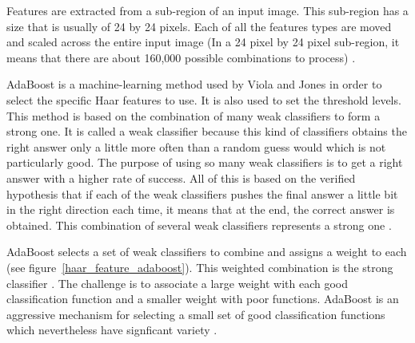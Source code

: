 \vspace{\baselineskip}
\noindent Features are extracted from a sub-region of an input image. This sub-region has a size that is usually of 24 by 24 pixels. Each of all the features types are moved and scaled across the entire input image (In a 24 pixel by 24 pixel sub-region, it means that there are about 160,000 possible combinations to process) \cite{SMY07}.
\newline

\noindent AdaBoost is a machine-learning method used by Viola and Jones in order to select the specific Haar features to use. It is also used to set the threshold levels. This method is based on the combination of many weak classifiers to form a strong one. It is called a weak classifier because this kind of classifiers obtains the right answer only a little more often than a random guess would which is not particularly good. The purpose of using so many weak classifiers is to get a right answer with a higher rate of success. All of this is based on the verified hypothesis that if each of the weak classifiers pushes the final answer a little bit in the right direction each time, it means that at the end, the correct answer is obtained. This combination of several weak classifiers represents a strong one \cite{HEW07}. 
\newline

\noindent AdaBoost selects a set of weak classifiers to combine and assigns a weight to each (see figure~\ref{haar_feature_adaboost}). This weighted combination is the strong classifier \cite{HEW07}. The challenge is to associate a large weight with each good classification function and a smaller weight with poor functions. AdaBoost is an aggressive mechanism for selecting a small set of good classification functions which nevertheless have signficant variety \cite{VIO01}.
\newline


